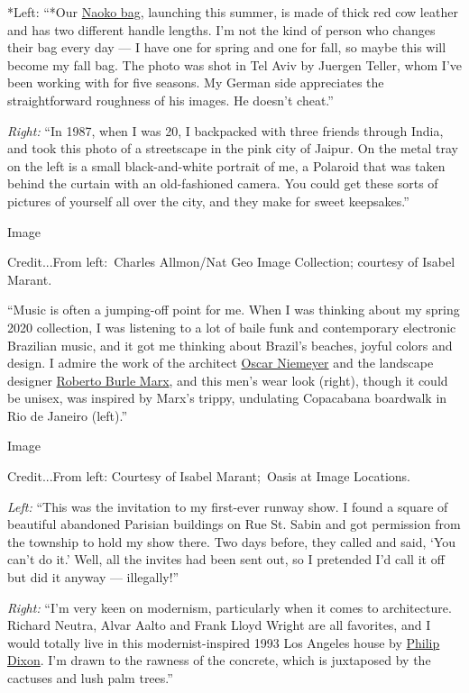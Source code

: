 *Left: ``*Our
\href{https://www.isabelmarant.com/us/isabel-marant/women/naoko}{Naoko
bag}, launching this summer, is made of thick red cow leather and has
two different handle lengths. I'm not the kind of person who changes
their bag every day --- I have one for spring and one for fall, so maybe
this will become my fall bag. The photo was shot in Tel Aviv by Juergen
Teller, whom I've been working with for five seasons. My German side
appreciates the straightforward roughness of his images. He doesn't
cheat.''

\emph{Right:} ``In 1987, when I was 20, I backpacked with three friends
through India, and took this photo of a streetscape in the pink city of
Jaipur. On the metal tray on the left is a small black-and-white
portrait of me, a Polaroid that was taken behind the curtain with an
old-fashioned camera. You could get these sorts of pictures of yourself
all over the city, and they make for sweet keepsakes.''

Image

Credit...From left:~Charles Allmon/Nat Geo Image Collection; courtesy of
Isabel Marant.

``Music is often a jumping-off point for me. When I was thinking about
my spring 2020 collection, I was listening to a lot of baile funk and
contemporary electronic Brazilian music, and it got me thinking about
Brazil's beaches, joyful colors and design. I admire the work of the
architect
\href{https://www.nytimes.com/2018/08/17/t-magazine/niemeyer-house-adriana-varejao.html}{Oscar
Niemeyer} and the landscape designer
\href{https://www.nytimes.com/2019/06/20/arts/design/roberto-burle-marx-botanical-garden.html}{Roberto
Burle Marx}, and this men's wear look (right), though it could be
unisex, was inspired by Marx's trippy, undulating Copacabana boardwalk
in Rio de Janeiro (left).''

Image

Credit...From left: Courtesy of Isabel Marant;~Oasis at Image Locations.

\emph{Left:} ``This was the invitation to my first-ever runway show. I
found a square of beautiful abandoned Parisian buildings on Rue St.
Sabin and got permission from the township to hold my show there. Two
days before, they called and said, `You can't do it.' Well, all the
invites had been sent out, so I pretended I'd call it off but did it
anyway --- illegally!''

\emph{Right:} ``I'm very keen on modernism, particularly when it comes
to architecture. Richard Neutra, Alvar Aalto and Frank Lloyd Wright are
all favorites, and I would totally live in this modernist-inspired 1993
Los Angeles house by
\href{https://www.architecturaldigest.com/gallery/inside-the-most-instagrammed-house-in-los-angeles}{Philip
Dixon}. I'm drawn to the rawness of the concrete, which is juxtaposed by
the cactuses and lush palm trees.''

